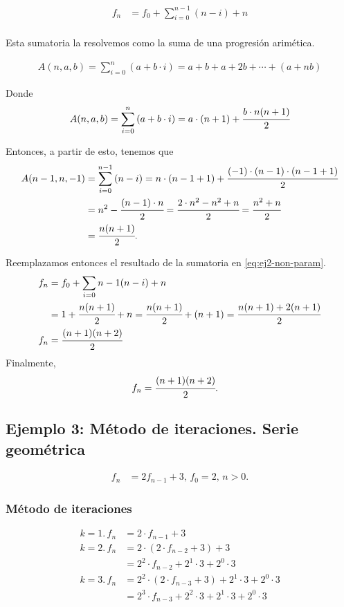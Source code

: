 \begin{align}
\label{eq:ej2-non-param}
f_n&=f_{0}+\sum_{i=0}^{n-1}{(n-i)}+n\\
\end{align}

Esta sumatoria la resolvemos como la suma de una progresión arimética.

\begin{align*}
A(n, a, b)=\sum_{i=0}^{n}{(a+b\cdot i)}=a+b+a+2b+\cdots+(a+nb)
\end{align*}

Donde
\begin{align}
\label{eq:sum-aritm}
	A(n, a, b)=\sum_{i=0}^{n}{(a+b\cdot i)}=a\cdot (n+1)+\cfrac{b\cdot n(n+1)}{2}
\end{align}

Entonces, a partir de esto, tenemos que 
\begin{align*}
A(n-1, n, -1)&=\sum_{i=0}^{n-1}{(n-i)}=n\cdot (n-1+1)+\cfrac{(-1)\cdot (n-1)\cdot (n-1+1)}{2}\\
&=n^2-\cfrac{(n-1)\cdot n}{2}=\cfrac{2\cdot n^2-n^2+n}{2}=\cfrac{n^2+n}{2}\\
&=\cfrac{n(n+1)}{2}.
\end{align*}

Reemplazamos entonces el resultado de la sumatoria en \eqref{eq:ej2-non-param}.
\begin{align*}
f_n&=f_0+\sum_{i=0}{n-1}{(n-i)}+n\\
&=1+\cfrac{n(n+1)}{2}+n=\cfrac{n(n+1)}{2}+(n+1)=\cfrac{n(n+1)+2(n+1)}{2}\\
f_n&=\cfrac{(n+1)(n+2)}{2}
\end{align*}
Finalmente,
\begin{align*}
f_n&=\cfrac{(n+1)(n+2)}{2}.
\end{align*}

\subsection{Ejemplo 3: Método de iteraciones. Serie geométrica}

\begin{align*}
f_n&=2f_{n-1}+3,\,f_0=2,\,n>0.
\end{align*}

\subsubsection{Método de iteraciones}
\begin{align*}
k=1.\, f_n&=2\cdot f_{n-1}+3\\
k=2.\, f_n&=2\cdot(2\cdot f_{n-2}+3)+3\\
&=2^2\cdot f_{n-2}+2^1\cdot 3 +2^0\cdot 3\\
k=3.\,f_n&=2^2\cdot (2\cdot f_{n-3}+3)+2^1\cdot 3 + 2^0\cdot 3\\
&=2^3\cdot f_{n-3}+2^2\cdot 3 + 2^1\cdot 3 + 2^0\cdot 3
\end{align*}


